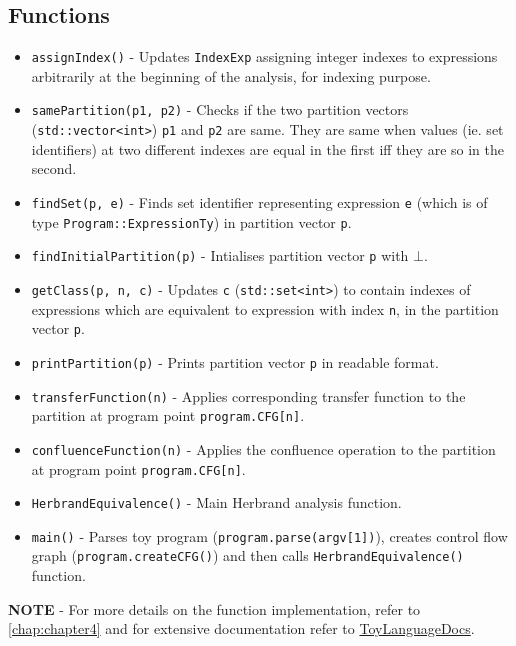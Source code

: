 \subsection{Functions}
\label{subsec:FunctionsHerbrandEquivalenceCpp}
\begin{itemize} \tightlist
    \item \texttt{assignIndex()} - Updates \texttt{IndexExp} assigning integer indexes to expressions arbitrarily at the beginning of the analysis, for indexing purpose.
    \item \texttt{samePartition(p1, p2)} - Checks if the two partition vectors (\texttt{std::vector<int>}) \texttt{p1} and \texttt{p2} are same. They are same when values (ie. set identifiers) at two different indexes are equal in the first iff they are so in the second.
    \item \texttt{findSet(p, e)} - Finds set identifier representing expression \texttt{e} (which is of type \texttt{Program::ExpressionTy}) in partition vector \texttt{p}.
    \item \texttt{findInitialPartition(p)} - Intialises partition vector \texttt{p} with $\bot$.
    \item \texttt{getClass(p, n, c)} - Updates \texttt{c} (\texttt{std::set<int>}) to contain indexes of expressions which are equivalent to expression with index \texttt{n}, in the partition vector \texttt{p}.
    \item \texttt{printPartition(p)} - Prints partition vector \texttt{p} in readable format.
    \item \texttt{transferFunction(n)} - Applies corresponding transfer function to the partition at program point \texttt{program.CFG[n]}.
    \item \texttt{confluenceFunction(n)} - Applies the confluence operation to the partition at program point \texttt{program.CFG[n]}.
    \item \texttt{HerbrandEquivalence()} - Main Herbrand analysis function.
    \item \texttt{main()} - Parses toy program (\texttt{program.parse(argv[1])}), creates control flow graph (\texttt{program.createCFG()}) and then calls \texttt{HerbrandEquivalence()} function.
\end{itemize}

\bigskip \noindent \textbf{NOTE} - For more details on the function implementation, refer to \autoref{chap:chapter4} and for extensive documentation refer to \href{https://himanshu520.github.io/HerbrandEquivalenceToyDocs/}{ToyLanguageDocs}.
